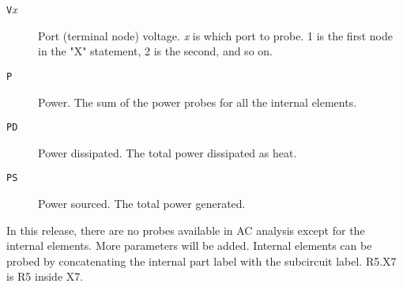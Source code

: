 \begin{description}

\item[{\tt V}{\it x}]  Port (terminal node) voltage.  {\it x} is
which port to probe.  1 is the first node in the "X" statement, 2
is the second, and so on.

\item[{\tt P}] Power.  The sum of the power probes for all the internal elements.

\item[{\tt PD}] Power dissipated.  The total power dissipated as heat.

\item[{\tt PS}] Power sourced.  The total power generated.

\end{description}

In this release, there are no probes available in AC analysis except for the
internal elements.  More parameters will be added.  Internal elements can be
probed by concatenating the internal part label with the subcircuit label.
R5.X7 is R5 inside X7.
